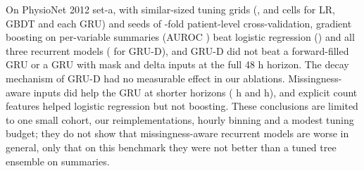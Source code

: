 On PhysioNet 2012 set-a, with similar-sized tuning grids (,  and  cells for LR, GBDT and each GRU) and  seeds of -fold patient-level cross-validation, gradient boosting on per-variable summaries (AUROC ) beat logistic regression () and all three recurrent models ( for GRU-D), and GRU-D did not beat a forward-filled GRU or a GRU with mask and delta inputs at the full 48 h horizon. The decay mechanism of GRU-D had no measurable effect in our ablations. Missingness-aware inputs did help the GRU at shorter horizons ( h and  h), and explicit count features helped logistic regression but not boosting. These conclusions are limited to one small cohort, our reimplementations, hourly binning and a modest tuning budget; they do not show that missingness-aware recurrent models are worse in general, only that on this benchmark they were not better than a tuned tree ensemble on summaries.
